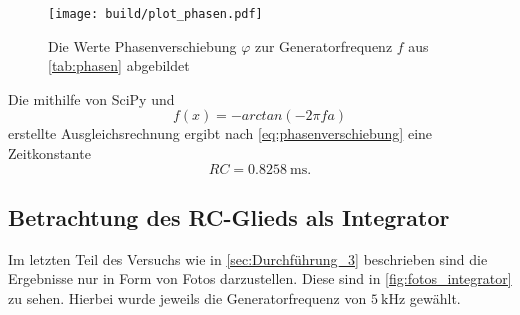 \begin{figure}
    \centering
    \texttt{[image: build/plot\_phasen.pdf]}
    \caption{Die Werte Phasenverschiebung $\varphi$ zur Generatorfrequenz $f$ aus \autoref{tab:phasen} abgebildet}
    \label{fig:plot_phasen}
\end{figure}

Die mithilfe von SciPy\cite{scipy} und
\begin{equation}
    f(x)=-arctan(-2\pi f a)
\end{equation}
erstellte Ausgleichsrechnung ergibt nach \autoref{eq:phasenverschiebung} eine Zeitkonstante
\begin{equation}
    RC = \SI{0.8258}{\milli\second}.
\end{equation}

\subsection{Betrachtung des RC-Glieds als Integrator}
\label{sec:Auswertung_Integrator}

Im letzten Teil des Versuchs wie in \autoref{sec:Durchführung_3} beschrieben sind die Ergebnisse nur in Form von Fotos darzustellen. Diese sind in \autoref{fig:fotos_integrator} zu sehen. Hierbei wurde jeweils die Generatorfrequenz von $\SI{5}{\kilo\hertz}$ gewählt.

